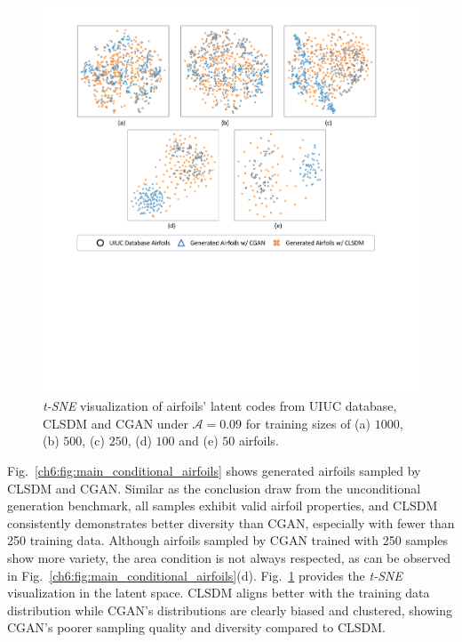 \begin{figure}[!t]
    \vspace{-6mm}
    \begin{center}
        \includegraphics[width=0.9\linewidth]{chapter6/fig/conditional_tsne.pdf}
    \end{center}
    \vspace{-4mm}
    \caption{
        \small \textit{t-SNE} visualization of airfoils' latent codes from UIUC database, CLSDM and CGAN under $\mathcal{A}=0.09$ for training sizes of (a) $1000$, (b) $500$, (c) $250$, (d) $100$ and (e) $50$ airfoils.
    }
    \label{ch6:fig:main_conditional_tsne}
\end{figure}

Fig.~\ref{ch6:fig:main_conditional_airfoils} shows generated airfoils sampled by CLSDM and CGAN. Similar as the conclusion draw from the unconditional generation benchmark, all samples exhibit valid airfoil properties, and CLSDM consistently demonstrates better diversity than CGAN, especially with fewer than 250 training data. Although airfoils sampled by CGAN trained with 250 samples show more variety, the area condition is not always respected, as can be observed in Fig.~\ref{ch6:fig:main_conditional_airfoils}(d). Fig.~\ref{ch6:fig:main_conditional_tsne} provides the \textit{t-SNE} visualization in the latent space. CLSDM aligns better with the training data distribution while CGAN's distributions are clearly biased and clustered, showing CGAN's poorer sampling quality and diversity compared to CLSDM.

